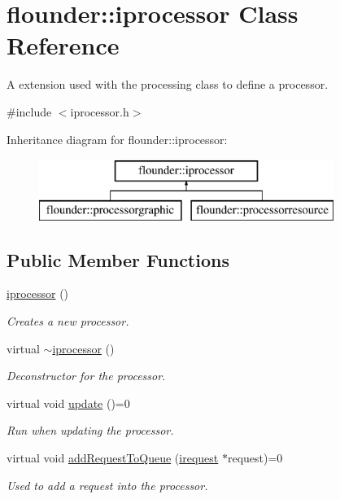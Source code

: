 \hypertarget{classflounder_1_1iprocessor}{}\section{flounder\+:\+:iprocessor Class Reference}
\label{classflounder_1_1iprocessor}


A extension used with the processing class to define a processor.  




{\ttfamily \#include $<$iprocessor.\+h$>$}

Inheritance diagram for flounder\+:\+:iprocessor\+:\begin{figure}[H]
\begin{center}
\leavevmode
\includegraphics[height=2.000000cm]{classflounder_1_1iprocessor}
\end{center}
\end{figure}
\subsection*{Public Member Functions}
\begin{DoxyCompactItemize}
\item 
\hyperlink{classflounder_1_1iprocessor_ab351ec26d7ab76982cbe75f2006f73cd}{iprocessor} ()
\begin{DoxyCompactList}\small\item\em Creates a new processor. \end{DoxyCompactList}\item 
virtual \hyperlink{classflounder_1_1iprocessor_af643d5afcae2129f8ab0f9750373e9ef}{$\sim$iprocessor} ()
\begin{DoxyCompactList}\small\item\em Deconstructor for the processor. \end{DoxyCompactList}\item 
virtual void \hyperlink{classflounder_1_1iprocessor_ad2edfece3465ec3dbe0a5feac26bdbc3}{update} ()=0
\begin{DoxyCompactList}\small\item\em Run when updating the processor. \end{DoxyCompactList}\item 
virtual void \hyperlink{classflounder_1_1iprocessor_ad721814a6a2c69f526527c7b2f57a11b}{add\+Request\+To\+Queue} (\hyperlink{classflounder_1_1irequest}{irequest} $\ast$request)=0
\begin{DoxyCompactList}\small\item\em Used to add a request into the processor. \end{DoxyCompactList}\end{DoxyCompactItemize}


